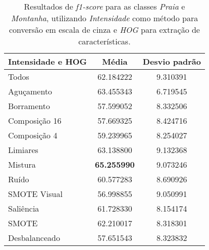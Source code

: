 \begin{itemize}
\begin{table}[!htbp]
\centering
\caption{Resultados de \textit{f1-score} para as classes \emph{Praia} e \emph{Montanha}, utilizando \emph{Intensidade} como método para conversão em escala de cinza e \emph{HOG} para extração de características.}
\label{tab:resultados:2:pior}
\begin{tabular}{|l|c|c|}
\hline
\textbf{Intensidade e HOG} & \textbf{Média}     & \textbf{Desvio padrão} \\ \hline
Todos                      & 62.184222          & 9.310391               \\ \hline
Aguçamento                 & 63.455343          & 6.719545               \\ \hline
Borramento                 & 57.599052          & 8.332506               \\ \hline
Composição 16              & 57.669325          & 8.424716               \\ \hline
Composição 4               & 59.239965          & 8.254027               \\ \hline
Limiares                   & 63.138800          & 9.132368               \\ \hline
Mistura                    & \textbf{65.255990} & 9.073246               \\ \hline
Ruído                      & 60.577283          & 8.690926               \\ \hline
SMOTE Visual               & 56.998855          & 9.050991               \\ \hline
Saliência                  & 61.728330          & 8.154174               \\ \hline
SMOTE                      & 62.210017          & 8.318301               \\ \hline
Desbalanceado              & 57.651543          & 8.323832               \\ \hline
\end{tabular}
\end{table}




\end{itemize}

